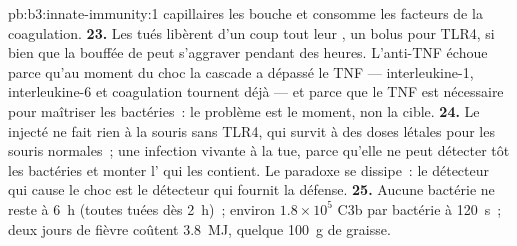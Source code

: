 \begin{solution}{pb:b3:innate-immunity:1}
capillaires les bouche et consomme les facteurs de la coagulation.
\textbf{23.} Les  tués libèrent d'un coup tout leur
, un bolus pour TLR4, si bien que la bouffée de
 peut s'aggraver pendant des heures. L'anti-TNF échoue parce
qu'au moment du choc la cascade a dépassé le TNF --- interleukine-1,
interleukine-6 et coagulation tournent déjà --- et parce que le TNF est
nécessaire pour maîtriser les bactéries~: le problème est le moment, non
la cible.
\textbf{24.} Le  injecté ne fait rien à la souris sans
TLR4, qui survit à des doses létales pour les souris normales~; une
infection vivante à  la tue, parce qu'elle ne peut détecter
tôt les bactéries et monter l' qui les contient. Le paradoxe
se dissipe~: le détecteur qui cause le choc est le détecteur qui fournit
la défense.
\textbf{25.} Aucune bactérie ne reste à \qty{6}{h} (toutes tuées dès
\qty{2}{h})~; environ $1.8\times 10^{5}$ C3b par bactérie à
\qty{120}{s}~; deux jours de fièvre coûtent \qty{3.8}{MJ}, quelque
\qty{100}{g} de graisse.
\end{solution}
